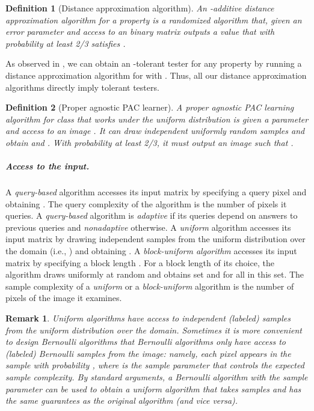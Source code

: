 \documentclass[11pt,english]{article}
\newtheorem{remark}[theorem]{Remark}
\newtheorem{definition}{Definition}[section]
\numberwithin{figure}{section}
\begin{document}
\begin{definition}[Distance approximation algorithm]\label{def:distance-approx-alg}
An {\em -additive distance approximation algorithm} for a property  is a randomized algorithm that, given an error parameter  and access to an  binary matrix  outputs a value  that with probability at least 2/3 satisfies .
\end{definition}

As observed in \cite{PRR06}, we can obtain an -tolerant tester for any property  by running a distance approximation algorithm for  with . Thus, all our distance approximation algorithms directly imply tolerant testers.

\begin{definition}[Proper agnostic PAC learner]

A proper agnostic PAC learning algorithm for class  that works under the uniform distribution is given a parameter  and access to an image . It can draw independent uniformly random samples   and obtain  and . With probability at least 2/3, it must output an image  such that .
\end{definition}
\fi
\subparagraph{Access to the input.}
A {\em query-based} algorithm accesses its  input matrix  by specifying a query pixel  and obtaining .
\ifnum{}
The query complexity of the algorithm is the number of pixels it queries.
A {\em query-based} algorithm is {\em adaptive} if its queries depend on answers to previous queries and {\em nonadaptive} otherwise.
\fi
A {\em uniform} algorithm accesses its  input matrix by drawing independent samples  from the uniform distribution over the domain (i.e., ) and obtaining .
A {\em block-uniform algorithm} accesses its  input matrix by specifying a block length . For a block length  of its choice, the algorithm draws  uniformly at random and obtains set  and  for all  in this set.
The sample complexity of a {\em uniform} or a {\em block-uniform} algorithm is the number of pixels of the image it examines.

\begin{remark}\label{remark:bernoulli}
Uniform algorithms have access to independent (labeled) samples from the uniform distribution over the domain.
\ifnum{}
Sometimes it is more convenient to design
{\em Bernoulli algorithms} that
\else
{\em Bernoulli algorithms}
\fi
only have access to (labeled) Bernoulli samples from the image: namely, each pixel appears in the sample with probability , where  is the sample parameter that controls the expected sample complexity.
By standard arguments, a Bernoulli algorithm with the sample parameter  can be used to obtain a uniform algorithm that takes  samples and has the same guarantees as the original algorithm (and vice versa).
\end{remark}
\end{document}
